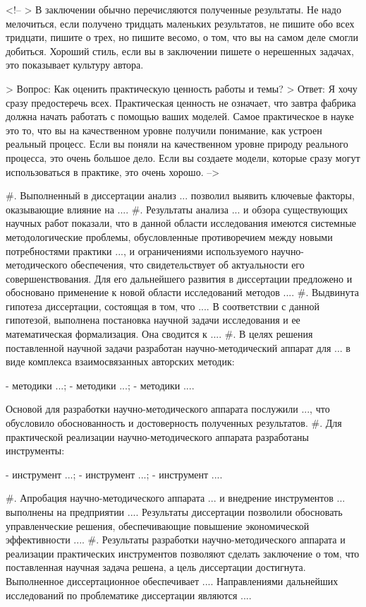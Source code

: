 <!--
> В заключении обычно перечисляются полученные результаты. Не надо мелочиться, если получено тридцать маленьких результатов, не пишите обо всех тридцати, пишите о трех, но пишите весомо, о том, что вы на самом деле смогли добиться. Хороший стиль, если вы в заключении пишете о нерешенных задачах, это показывает культуру автора.

> Вопрос: Как оценить практическую ценность работы и темы?
> Ответ: Я хочу сразу предостеречь всех. Практическая ценность не означает, что завтра фабрика должна начать работать с помощью ваших моделей. Самое практическое в науке это то, что вы на качественном уровне получили понимание, как устроен реальный процесс. Если вы поняли на качественном уровне природу реального процесса, это очень большое дело. Если вы создаете модели, которые сразу могут использоваться в практике, это очень хорошо. -->

#. Выполненный в диссертации анализ ... позволил выявить ключевые факторы, оказывающие влияние на ....
#. Результаты анализа ... и обзора существующих научных работ показали, что в данной области исследования имеются системные методологические проблемы, обусловленные противоречием между новыми потребностями практики ..., и ограничениями используемого научно-методического обеспечения, что свидетельствует об актуальности его совершенствования. Для его дальнейшего развития в диссертации предложено и обосновано применение к новой области исследований методов .... 
#. Выдвинута гипотеза диссертации, состоящая в том, что .... В соответствии с данной гипотезой, выполнена постановка научной задачи исследования и ее математическая формализация. Она сводится к ....
#. В целях решения поставленной научной задачи разработан научно-методический аппарат для ... в виде комплекса взаимосвязанных авторских методик:

- методики ...;
- методики ...;
- методики ....
 
Основой для разработки научно-методического аппарата послужили ..., что обусловило обоснованность и достоверность полученных результатов.
#. Для практической реализации научно-методического аппарата разработаны инструменты:

- инструмент ...;
- инструмент ...;
- инструмент ....

#. Апробация научно-методического аппарата ... и внедрение инструментов ... выполнены на предприятии .... Результаты диссертации позволили обосновать управленческие решения, обеспечивающие повышение экономической эффективности ....
#. Результаты разработки научно-методического аппарата и реализации практических инструментов позволяют сделать заключение о том, что поставленная научная задача решена, а цель диссертации достигнута. Выполненное диссертационное обеспечивает .... Направлениями дальнейших исследований по проблематике диссертации являются ....